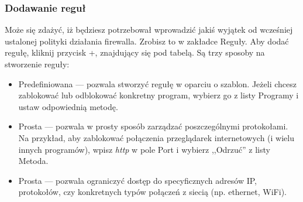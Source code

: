 \subsubsection{Dodawanie reguł}
Może się zdażyć, iż będziesz potrzebował wprowadzić jakiś wyjątek od wcześniej ustalonej polityki działania firewalla. Zrobisz to w zakładce \textcolor{ubuntu_orange}{Reguły}. Aby dodać regułę, kliknij przycisk +, znajdujący się pod tabelą. Są trzy sposoby na stworzenie reguły:

\begin{itemize}
\item \textcolor{ubuntu_orange}{Predefiniowana} --- pozwala stworzyć regułę w oparciu o szablon. Jeżeli chcesz zablokować lub odblokować konkretny program, wybierz go z listy \textcolor{ubuntu_orange}{Programy} i ustaw odpowiednią metodę.
\item \textcolor{ubuntu_orange}{Prosta} --- pozwala w prosty sposób zarządzać poszczególnymi protokołami. Na przykład, aby zablokować połączenia przeglądarek internetowych (i wielu innych programów), wpisz \textit{http} w pole \textcolor{ubuntu_orange}{Port} i wybierz ,,Odrzuć'' z listy \textcolor{ubuntu_orange}{Metoda}.
\item \textcolor{ubuntu_orange}{Prosta} --- pozwala ograniczyć dostęp do specyficznych adresów IP, protokołów, czy konkretnych typów połączeń z siecią (np. ethernet, WiFi).
\end{itemize}
